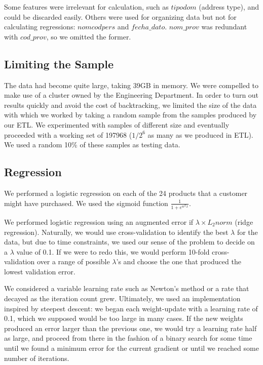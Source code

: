 \documentclass{article}
\begin{document}
\begin{spacing}{1}
\begin{large}
Some features were irrelevant for calculation, such as $tipodom$ (address type), and could be discarded easily. Others were used for organizing data but not for calculating regressions: $nomcodpers$ and $fecha\_dato$. $nom\_prov$ was redundant with $cod\_prov$, so we omitted the former.

\subsection{Limiting the Sample}

The data had become quite large, taking 39GB in memory. We were compelled to make use of a cluster owned by the Engineering Department. In order to turn out results quickly and avoid the cost of backtracking, we limited the size of the data with which we worked by taking a random sample from the samples produced by our ETL. We experimented with samples of different size and eventually proceeded with a working set of 197968 ($1/2^6$ as many as we produced in ETL). We used a random 10\% of these samples as testing data.

\subsection{Regression}

We performed a logistic regression on each of the 24 products that a customer might have purchased. We used the sigmoid function $\frac{1}{1+e^{w^Tx}}$.

We performed logistic regression using an augmented error if $\lambda \times L_2norm$ (ridge regression). Naturally, we would use cross-validation to identify the best $\lambda$ for the data, but due to time constraints, we used our sense of the problem to decide on a $\lambda$ value of 0.1. If we were to redo this, we would perform 10-fold cross-validation over a range of possible $\lambda$'s and choose the one that produced the lowest validation error.

We considered a variable learning rate such as Newton's method or a rate that decayed as the iteration count grew. Ultimately, we used an implementation inspired by steepest descent: we began each weight-update with a learning rate of 0.1, which we supposed would be too large in many cases. If the new weights produced an error larger than the previous one, we would try a learning rate half as large, and proceed from there in the fashion of a binary search for some time until we found a minimum error for the current gradient or until we reached some number of iterations.


\end{large}
\end{spacing}
\end{document}
